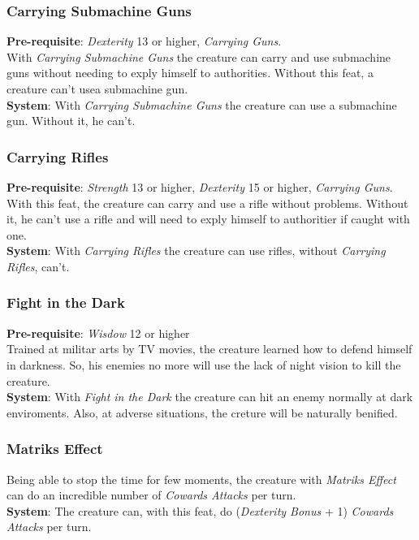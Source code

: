 \documentclass[ letterpaper,12pt]{article}
\begin{document}
\subsubsection{Carrying Submachine Guns}
{\bf Pre-requisite}: {\it Dexterity} 13 or higher, {\it Carrying Guns}.\\
With {\it Carrying Submachine Guns} the creature can carry and use submachine guns without needing to exply himself to authorities. Without this feat, a creature can't usea submachine gun.\\
{\bf System}: With {\it Carrying Submachine Guns} the creature can use a submachine gun. Without it, he can't.


\subsubsection{Carrying Rifles}
{\bf Pre-requisite}: {\it Strength} 13 or higher, {\it Dexterity} 15 or higher, {\it Carrying Guns}.\\
With this feat, the creature can carry and use a rifle without problems. Without it, he can't use a rifle and will need to exply himself to authoritier if caught with one.\\
{\bf System}: With {\it Carrying Rifles} the creature can use rifles, without {\it Carrying Rifles}, can't.

\subsubsection{Fight in the Dark}
{\bf Pre-requisite}: {\it Wisdow} 12 or higher\\
Trained at militar arts by TV movies, the creature learned how to defend himself in darkness. So, his enemies no more will use the lack of night vision to kill the creature.\\
{\bf System}: With {\it Fight in the Dark} the creature can hit an enemy normally at dark enviroments. Also, at adverse situations, the creture will be naturally benified.\\

\subsubsection{Matriks Effect}
Being able to stop the time for few moments, the creature with {\it Matriks Effect} can do an incredible number of {\it Cowards Attacks} per turn.\\
{\bf System}: The creature can, with this feat, do ({\it Dexterity Bonus} + 1) {\it Cowards Attacks} per turn.
\end{document}
